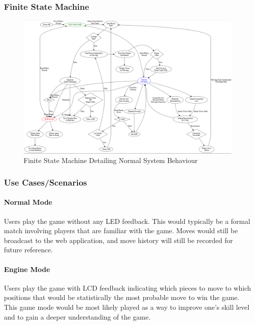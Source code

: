 \documentclass[12pt]{article}
\begin{document}
{\subsubsection{Finite State Machine}{
\begin{figure}[H]
    \begin{center}
      \includegraphics[scale=0.5]{chess-connect-FSM.png}
      \caption{Finite State Machine Detailing Normal System Behaviour}
      \label{Fig_FSM} 
    \end{center}
  \end{figure}
}

\subsubsection{Use Cases/Scenarios}{
    
    \paragraph{Normal Mode}{
        Users play the game without any LED feedback. This would typically be a formal match involving players that are familiar with the game. Moves would still be broadcast to the
        web application, and move history will still be recorded for future reference.
    }
        
    \paragraph{Engine Mode}{
        Users play the game with LCD feedback indicating which pieces to move to which positions that would be statistically the most probable move to win the game. This game mode would
        be most likely played as a way to improve one's skill level and to gain a deeper understanding of the game.
    }
    
}}
\end{document}

